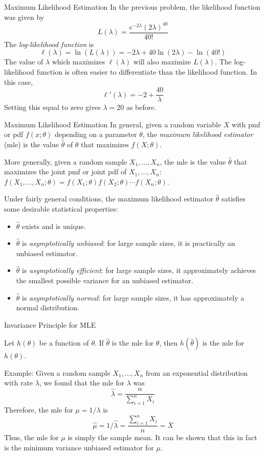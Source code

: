 \documentclass[t,handout]{beamer}
\begin{document}
    \begin{frame}{Maximum Likelihood Estimation}
    In the previous problem, the likelihood function was given by
    $$L(\lambda)=\frac{e^{-2\lambda}(2\lambda)^{40}}{40!}$$
    \pause The \emph{log-likelihood function} is
    $$\ell(\lambda) = \ln(L(\lambda)) = -2\lambda+40\ln(2\lambda)-\ln(40!)$$
    \pause The value of $\lambda$ which maximizes $\ell(\lambda)$ will also maximize $L(\lambda)$. The log-likelihood function is often easier to differentiate than the likelihood function. 
    \pause In this case,
    $$\ell'(\lambda) = -2+\frac{40}\lambda$$
    \pause Setting this equal to zero gives $\lambda=20$ as before.
\end{frame}
\begin{frame}{Maximum Likelihood Estimation}
    In general, given a random variable $X$ with pmf or pdf $f(x; \theta)$ depending on a parameter $\theta$, the \emph{maximum likelihood estimator} (mle) is the value $\hat\theta$ of $\theta$ that maximizes $f(X; \theta)$. 
    
    \vspace{.2cm}
    \pause More generally, given a random sample $X_1,\dots,X_n$, the mle is the value $\hat\theta$ that maximizes the joint pmf or joint pdf of $X_1,\dots,X_n$: $f(X_1,\dots,X_n; \theta)=f(X_1;\theta)f(X_2;\theta)\cdots f(X_n;\theta)$.
    
    \pause \vspace{.2cm}Under fairly general conditions, the maximum likelihood estimator $\hat\theta$ satisfies some desirable statistical properties:
    \begin{itemize}
    \pause \item $\hat\theta$ exists and is unique.
    \pause \item $\hat\theta$ is \textit{asymptotically unbiased}: for large sample sizes, it is practically an unbiased estimator. 
    \pause \item $\hat\theta$ is \textit{asymptotically efficient}: for large sample sizes, it approximately achieves the smallest possible variance for an unbiased estimator.
    \pause \item $\hat\theta$ is \textit{asymptotically normal}: for large sample sizes, it has approximately a normal distribution.
    \end{itemize}
    \end{frame}
    \begin{frame}{Invariance Principle for MLE}
        \begin{block}{}
        Let $h(\theta)$ be a function of $\theta$. If $\hat\theta$ is the mle for $\theta$, then $h(\hat\theta)$ is the mle for $h(\theta)$.
        \end{block}
        \pause Example: Given a random sample $X_1,\dots,X_n$ from an exponential distribution with rate $\lambda$, we found that the mle for $\lambda$ was $$\hat\lambda = \frac{n}{\sum_{i=1}^n X_i}$$
        Therefore, the mle for $\mu=1/\lambda$ is $$\hat\mu = 1/\hat\lambda = \frac{\sum_{i=1}^n X_i}n = \overline{X}$$
        Thus, the mle for $\mu$ is simply the sample mean. It can be shown that this in fact is the minimum variance unbiased estimator for $\mu$.

        \end{frame}
\end{document}
